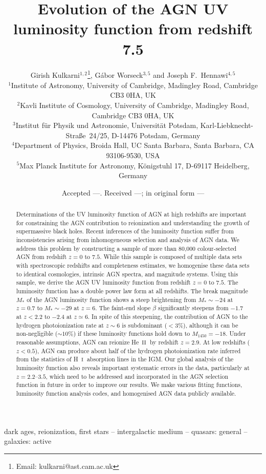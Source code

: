 \documentclass[fleqn,usenatbib]{mnras}
\title[AGN luminosity function]{Evolution of the AGN UV
  luminosity function from redshift 7.5}
\author[Kulkarni et al.]
       {{Girish Kulkarni$^{1,2}$\thanks{Email: kulkarni@ast.cam.ac.uk},
           G\'abor Worseck$^{3,5}$
           and Joseph F.~Hennawi$^{4,5}$} \\
         $^1$Institute of Astronomy,
         University of Cambridge, Madingley Road, Cambridge CB3 0HA,
         UK \\
         $^2$Kavli Institute of Cosmology,
         University of Cambridge, Madingley Road, Cambridge CB3 0HA,
         UK \\
         $^3$Institut f\"ur Physik und Astronomie, Universit\"at
         Potsdam, Karl-Liebknecht-Stra\ss e\ 24/25, D-14476 Potsdam,
         Germany \\
         $^4$Department of Physics, Broida Hall, UC Santa Barbara,
         Santa Barbara, CA 93106-9530, USA\\
         $^5$Max Planck Institute for Astronomy, K\"onigstuhl 17,
         D-69117 Heidelberg, Germany}
\date{Accepted ---. Received ---; in original form ---}
\def\HI{\hbox{H~$\scriptstyle\rm I$}}
\def\HeII{\hbox{He~$\scriptstyle\rm II$}}
\begin{document}
\label{firstpage}
\pagerange{\pageref{firstpage}--\pageref{lastpage}}
\maketitle

\begin{abstract}
  Determinations of the UV luminosity function of AGN at high
  redshifts are important for constraining the AGN contribution to
  reionization and understanding the growth of supermassive black
  holes.  Recent inferences of the luminosity function suffer from
  inconsistencies arising from inhomogeneous selection and analysis of
  AGN data.  We address this problem by constructing a sample of more
  than 80,000 colour-selected AGN from redshift $z=0$ to $7.5$.  While
  this sample is composed of multiple data sets with spectroscopic
  redshifts and completeness estimates, we homogenise these data sets
  to identical cosmologies, intrinsic AGN spectra, and magnitude
  systems.  Using this sample, we derive the AGN UV luminosity
  function from redshift $z=0$ to $7.5$.  The luminosity function has
  a double power law form at all redshifts.  The break magnitude $M_*$
  of the AGN luminosity function shows a steep brightening from
  $M_*\sim -24$ at $z=0.7$ to $M_*\sim -29$ at $z=6$.  The faint-end
  slope $\beta$ significantly steepens from $-1.7$ at $z<2.2$ to
  $-2.4$ at $z\simeq 6$.  In spite of this steepening, the
  contribution of AGN to the hydrogen photoionization rate at $z\sim
  6$ is subdominant ($<3$\%), although it can be non-negligible ($\sim
  10$\%) if these luminosity functions hold down to $M_{1450}=-18$.
  Under reasonable assumptions, AGN can reionize \HeII\ by redshift
  $z=2.9$.  At low redshifts ($z<0.5$), AGN can produce about half of
  the hydrogen photoionization rate inferred from the statistics of
  \HI\ absorption lines in the IGM.  Our global analysis of the
  luminosity function also reveals important systematic errors in the
  data, particularly at $z=2.2$--$3.5$, which need to be addressed and
  incorporated in the AGN selection function in future in order to
  improve our results.  We make various fitting functions, luminosity
  function analysis codes, and homogenised AGN data publicly
  available.
\end{abstract}

\begin{keywords}
  dark ages, reionization, first stars -- intergalactic medium --
  quasars: general -- galaxies: active
\end{keywords}
\end{document}

